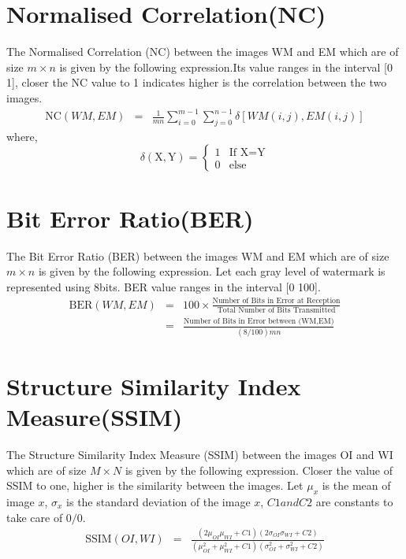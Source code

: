 \section{Normalised Correlation(NC)} 
The Normalised Correlation (NC) between the images WM and EM which are of size $m \times n$ is given by the following expression.Its value ranges in the interval [0 1], closer the NC value to 1 indicates higher is the correlation between the two images.
\begin{eqnarray}
\nonumber
\text{NC}(WM,EM)&=&\frac{1}{mn}\sum_{i=0}^{m-1}\sum_{j=0}^{n-1}\delta[WM(i,j), EM(i,j)] 
\nonumber
\end{eqnarray}
where,
\begin{equation}
  \nonumber
  \delta(\text{X},\text{Y}) = \left\{ \begin{matrix} 1  & \text{If X}=\text{Y} \\ 0 &  \text{else}   \end{matrix} \right. 
  \end{equation}
\section{Bit Error Ratio(BER)} 
The Bit Error Ratio (BER) between the images WM and EM which are of size $m \times n$ is given by the following expression. Let each gray level of watermark is represented using 8bits. BER value ranges in the interval [0 100].
\begin{eqnarray}
\nonumber
\text{BER}(WM,EM)&=&100 \times \frac{\text{Number of Bits in Error at Reception}}{\text{Total Number of Bits Transmitted}} \\
&=& \frac{\text{Number of Bits in Error between (WM,EM)}}{(8/100)mn}
\nonumber
\end{eqnarray}

\section{Structure Similarity Index Measure(SSIM)}
The Structure Similarity Index Measure (SSIM) between the images OI and WI which are of size  $M \times N$ is given by the following expression. Closer the value of SSIM to one, higher is the similarity between the images. Let $\mu_x$ is the mean of image $x$, $\sigma_x$ is the standard deviation of the image $x$, $C1 and C2$ are constants to take care of $0/0$.
\begin{eqnarray}
\nonumber
\text{SSIM}(OI,WI)&=& \frac{(2\mu_{OI}\mu_{WI}+C1)(2\sigma_{OI}\sigma_{WI}+C2)}{(\mu_{OI}^2+\mu_{WI}^2+C1)(\sigma_{OI}^2+\sigma_{WI}^2+C2)}
\nonumber
\end{eqnarray}
\newline
